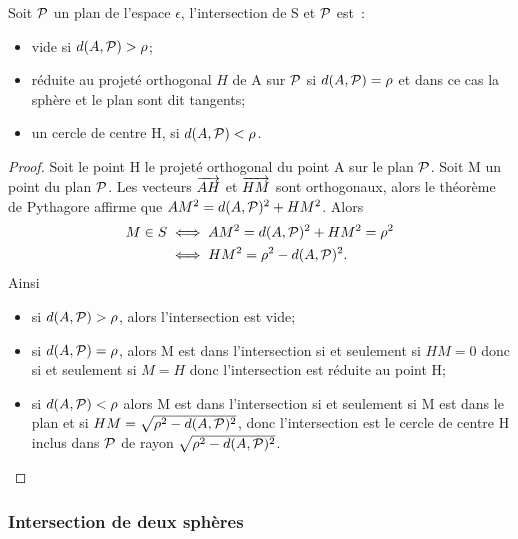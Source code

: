 \begin{prop}
  Soit $\P$ un plan de l'espace $\epsilon$, l'intersection de S et $\P$ est~:
  \begin{itemize}
  \item vide si $d(A,\P)>\rho$;
  \item réduite au projeté orthogonal $H$ de A sur $\P$ si $d(A,\P)=\rho$ et dans ce cas la sphère et le plan sont dit tangents;
  \item un cercle de centre H, si $d(A,\P)<\rho$.
  \end{itemize}
\end{prop}
\begin{proof}
  Soit le point H le projeté orthogonal du point A sur le plan $\P$. Soit M un point du plan $\P$. Les vecteurs $\vect{AH}$ et $\vect{HM}$ sont orthogonaux, alors le théorème de Pythagore affirme que $AM^2=d(A,\P)^2+HM^2$. Alors
  \begin{align}
    M \in S &\iff AM^2=d(A,\P)^2+HM^2=\rho^2\\
    &\iff HM^2=\rho^2-d(A,\P)^2.
  \end{align}
Ainsi
\begin{itemize}
\item si $d(A,\P)>\rho$, alors l'intersection est vide;
\item si $d(A,\P)=\rho$, alors M est dans l'intersection si et seulement si $HM=0$ donc si et seulement si $M=H$ donc l'intersection est réduite au point H;
\item si $d(A,\P)<\rho$ alors M est dans l'intersection si et seulement si M est dans le plan et si $HM=\sqrt{\rho^2-d(A,\P)^2}$, donc l'intersection est le cercle de centre H inclus dans $\P$ de rayon $\sqrt{\rho^2-d(A,\P)^2}$.
\end{itemize}
\end{proof}

\subsubsection{Intersection de deux sphères}

